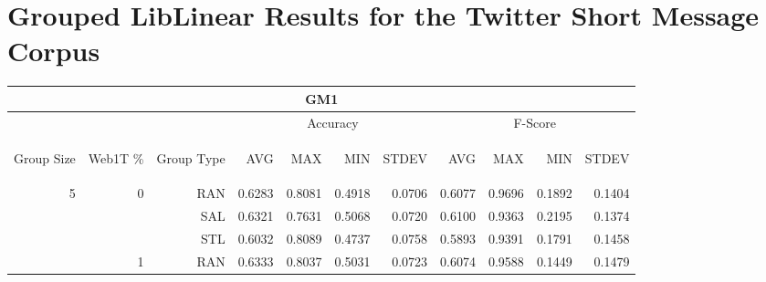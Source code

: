 \chapter{Grouped LibLinear Results for the Twitter Short Message Corpus}

\begin{center}
\begin{table}[htbp] 
 \begin{center}
\begin{tabular}{ | r | r | r | r | r | r | r | r | r | r | r |}
\hline
\multicolumn{11}{|c|}{GM1}\\
\hline
 & & & \multicolumn{4}{|c|}{Accuracy} & \multicolumn{4}{|c|}{F-Score}\\ \cline{4-11}
\begin{sideways}Group Size\end{sideways} & \begin{sideways}Web1T \%\end{sideways} & \begin{sideways}Group Type\end{sideways} & \begin{sideways}AVG\end{sideways} & \begin{sideways}MAX\end{sideways} & \begin{sideways}MIN\end{sideways} & \begin{sideways}STDEV\end{sideways} & \begin{sideways}AVG\end{sideways} & \begin{sideways}MAX\end{sideways} & \begin{sideways}MIN\end{sideways} & \begin{sideways}STDEV\end{sideways}\\
\hline
\multirow{18}{*}{5}
 & \multirow{3}{*}{0} & RAN & 0.6283 & 0.8081 & 0.4918 & 0.0706 & 0.6077 & 0.9696 & 0.1892 & 0.1404\\ \cline{3-11}
 &   & SAL & 0.6321 & 0.7631 & 0.5068 & 0.0720 & 0.6100 & 0.9363 & 0.2195 & 0.1374\\ \cline{3-11}
 &   & STL & 0.6032 & 0.8089 & 0.4737 & 0.0758 & 0.5893 & 0.9391 & 0.1791 & 0.1458\\ \cline{2-11}
 & \multirow{3}{*}{1} & RAN & 0.6333 & 0.8037 & 0.5031 & 0.0723 & 0.6074 & 0.9588 & 0.1449 & 0.1479\\ \cline{3-11}

\end{tabular}
\end{center}
\end{table}
\end{center}
